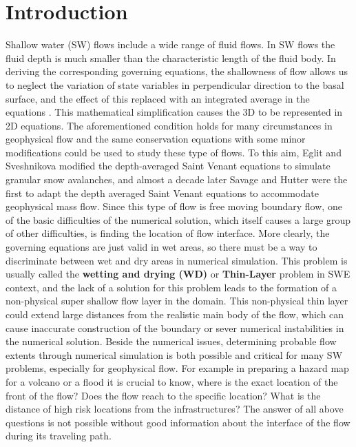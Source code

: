\documentclass[letterpaper,10pt]{article}
\begin{document}
\section{Introduction} 
\label{introduction}
Shallow water (SW) flows include a wide range of fluid flows. In SW flows the fluid depth is much 
smaller than the characteristic length of the fluid body. In deriving the corresponding 
governing equations, the shallowness of flow allows us to neglect the variation of state variables  in perpendicular direction to the basal surface, and the effect of 
this replaced with an integrated average in the equations \cite{Hutter2005}. 
This mathematical simplification causes the 3D to be represented in 2D equations.
The aforementioned condition holds for many circumstances in geophysical flow and the same 
conservation equations with some minor modifications could be used to study these type of flows. \newline
To this aim, Eglit and Sveshnikova \cite{eglit1980mms} modified the depth-averaged Saint Venant equations 
to simulate granular snow avalanches, and almost a decade later Savage and Hutter\cite{SavageHutter1989} 
were the first to adapt the depth averaged Saint Venant equations to accommodate  geophysical mass flow. 
Since this type of flow is free moving boundary flow, one of the basic difficulties 
of the numerical solution, which itself 
causes a large group of other difficulties, is finding the location of flow interface. 
More clearly, the governing equations are just valid in wet areas, so there must be a way to discriminate 
between wet and dry areas in numerical simulation. 
This problem is usually called the {\bf wetting and drying (WD)} or {\bf Thin-Layer} problem in SWE context, 
and the lack of a solution for this problem leads to the formation of a non-physical super shallow 
flow layer in the domain.
This non-physical thin layer could extend large distances from the realistic main 
body of the flow, which can cause inaccurate construction of the boundary or sever 
numerical instabilities in the numerical solution.\newline
Beside the numerical issues, determining probable flow extents through numerical simulation is both 
possible and critical for many SW problems, especially for geophysical flow. For example in preparing 
a hazard map for a volcano or a flood it is crucial to know, where is the exact location of the front of the
flow? Does the flow reach to the specific location? What is the distance of high risk locations from  
the infrastructures? \newline
The answer of all above questions is not possible without good information about the interface of 
the flow during its traveling path.\newline
\end{document}
